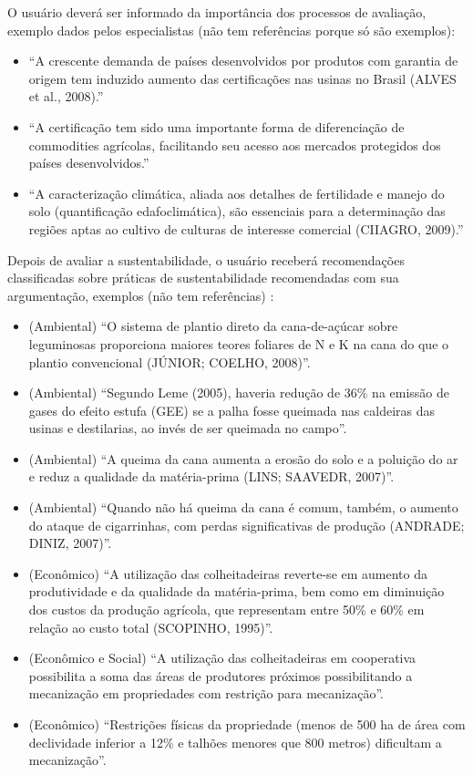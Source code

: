 O usuário deverá ser informado da importância dos processos de avaliação,
exemplo dados pelos especialistas (não tem referências porque só são
exemplos): 
\begin{itemize}
\item “A crescente demanda de países desenvolvidos por produtos com garantia
de origem tem induzido aumento das certificações nas usinas no Brasil
(ALVES et al., 2008).” 
\item “A certificação tem sido uma importante forma de diferenciação de
commodities agrícolas, facilitando seu acesso aos mercados protegidos
dos países desenvolvidos.” 
\item “A caracterização climática, aliada aos detalhes de fertilidade e
manejo do solo (quantificação edafoclimática), são essenciais para
a determinação das regiões aptas ao cultivo de culturas de interesse
comercial (CIIAGRO, 2009).”
\end{itemize}
Depois de avaliar a sustentabilidade, o usuário receberá recomendações
classificadas sobre práticas de sustentabilidade recomendadas com
sua argumentação, exemplos (não tem referências) : 
\begin{itemize}
\item (Ambiental) “O sistema de plantio direto da cana-de-açúcar sobre leguminosas
proporciona maiores teores foliares de N e K na cana do que o plantio
convencional (JÚNIOR; COELHO, 2008)”.
\item (Ambiental) “Segundo Leme (2005), haveria redução de 36\% na emissão
de gases do efeito estufa (GEE) se a palha fosse queimada nas caldeiras
das usinas e destilarias, ao invés de ser queimada no campo”.
\item (Ambiental) “A queima da cana aumenta a erosão do solo e a poluição
do ar e reduz a qualidade da matéria-prima (LINS; SAAVEDR, 2007)”.
\item (Ambiental) “Quando não há queima da cana é comum, também, o aumento
do ataque de cigarrinhas, com perdas significativas de produção (ANDRADE;
DINIZ, 2007)”. 
\item (Econômico) “A utilização das colheitadeiras reverte-se em aumento
da produtividade e da qualidade da matéria-prima, bem como em diminuição
dos custos da produção agrícola, que representam entre 50\% e 60\%
em relação ao custo total (SCOPINHO, 1995)”.
\item (Econômico e Social) “A utilização das colheitadeiras em cooperativa
possibilita a soma das áreas de produtores próximos possibilitando
a mecanização em propriedades com restrição para mecanização”.
\item (Econômico) “Restrições físicas da propriedade (menos de 500 ha de
área com declividade inferior a 12\% e talhões menores que 800 metros)
dificultam a mecanização”. 
\end{itemize}

